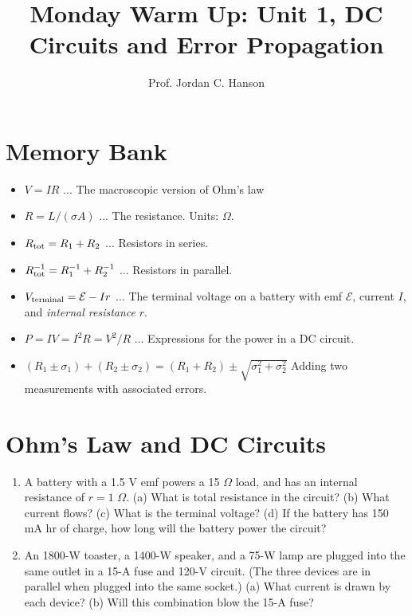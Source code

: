 \documentclass{article}
\begin{document}
\twocolumn

\title{Monday Warm Up: Unit 1, DC Circuits and Error Propagation}
\author{Prof. Jordan C. Hanson}

\maketitle

\section{Memory Bank}

\begin{itemize}
\item $V = IR$ ... The macroscopic version of Ohm's law
\item $R = L/(\sigma A)$ ... The resistance.  Units: $\Omega$.
\item $R_{\rm tot} = R_1 + R_2$ ... Resistors in series.
\item $R_{\rm tot}^{-1} = R_1^{-1} + R_2^{-1}$ ... Resistors in parallel.
\item $V_{\rm terminal} = \mathcal{E} - Ir$ ... The terminal voltage on a battery with emf $\mathcal{E}$, current $I$, and \textit{internal resistance} $r$.
\item $P = IV = I^2 R = V^2/R$ ... Expressions for the power in a DC circuit.
\item $(R_1 \pm \sigma_1) + (R_2 \pm \sigma_2) = (R_1 + R_2) \pm \sqrt{\sigma_1^2 + \sigma_2^2}$ Adding two measurements with associated errors.
\end{itemize}

\section{Ohm's Law and DC Circuits}

\begin{enumerate}
\item A battery with a 1.5 V emf powers a 15 $\Omega$ load, and has an internal resistance of $r = 1$ $\Omega$.  (a) What is total resistance in the circuit? (b) What current flows? (c) What is the terminal voltage? (d) If the battery has 150 mA hr of charge, how long will the battery power the circuit? \\ \vspace{5cm}
\item An 1800-W toaster, a 1400-W speaker, and a 75-W lamp are plugged into the same outlet in a 15-A fuse and 120-V circuit. (The three devices are in parallel when plugged into the same socket.) (a) What current is drawn by each device? (b) Will this combination blow the 15-A fuse? \\ \vspace{5cm}
\end{enumerate}
\end{document}
